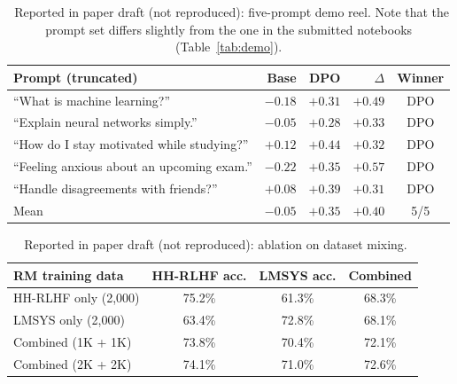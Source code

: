 \begin{table}[!htbp]
\centering
\caption[Paper draft (not reproduced): demo results]{\reportedtag\ Reported in paper draft (not reproduced): five-prompt demo reel. Note that the prompt set differs slightly from the one in the submitted notebooks (Table~\ref{tab:demo}).}
\label{tab:rep-demo}
\small
\begin{tabular}{@{}lrrrc@{}}
\toprule
\textbf{Prompt (truncated)} & \textbf{Base} & \textbf{DPO} & \textbf{$\Delta$} & \textbf{Winner}\\
\midrule
``What is machine learning?'' & $-0.18$ & $+0.31$ & $+0.49$ & DPO\\
``Explain neural networks simply.'' & $-0.05$ & $+0.28$ & $+0.33$ & DPO\\
``How do I stay motivated while studying?'' & $+0.12$ & $+0.44$ & $+0.32$ & DPO\\
``Feeling anxious about an upcoming exam.'' & $-0.22$ & $+0.35$ & $+0.57$ & DPO\\
``Handle disagreements with friends?'' & $+0.08$ & $+0.39$ & $+0.31$ & DPO\\
\midrule
Mean & $-0.05$ & $+0.35$ & $+0.40$ & 5/5\\
\bottomrule
\end{tabular}
\end{table}

\begin{table}[!htbp]
\centering
\caption[Paper draft (not reproduced): mixing ablation]{\reportedtag\ Reported in paper draft (not reproduced): ablation on dataset mixing.}
\label{tab:rep-ablation}
\small
\begin{tabular}{@{}lccc@{}}
\toprule
\textbf{RM training data} & \textbf{HH-RLHF acc.} & \textbf{LMSYS acc.} & \textbf{Combined}\\
\midrule
HH-RLHF only (2,000) & 75.2\% & 61.3\% & 68.3\%\\
LMSYS only (2,000) & 63.4\% & 72.8\% & 68.1\%\\
Combined (1K + 1K) & 73.8\% & 70.4\% & 72.1\%\\
Combined (2K + 2K) & 74.1\% & 71.0\% & 72.6\%\\
\bottomrule
\end{tabular}
\end{table}

